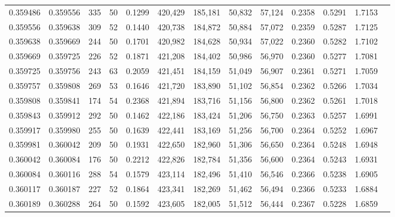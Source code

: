 \begin{tabular}{rrrrrrrrrrrrr}
0.359486 & 0.359556 &   335 &  50 &                                     0.1299 & 420,429 & 185,181 &  50,832 &  57,124 & 0.2358 & 0.5291 & 1.7153 \\
0.359556 & 0.359638 &   309 &  52 &                                     0.1440 & 420,738 & 184,872 &  50,884 &  57,072 & 0.2359 & 0.5287 & 1.7125 \\
0.359638 & 0.359669 &   244 &  50 &                                     0.1701 & 420,982 & 184,628 &  50,934 &  57,022 & 0.2360 & 0.5282 & 1.7102 \\
0.359669 & 0.359725 &   226 &  52 &                                     0.1871 & 421,208 & 184,402 &  50,986 &  56,970 & 0.2360 & 0.5277 & 1.7081 \\
0.359725 & 0.359756 &   243 &  63 &                                     0.2059 & 421,451 & 184,159 &  51,049 &  56,907 & 0.2361 & 0.5271 & 1.7059 \\
0.359757 & 0.359808 &   269 &  53 &                                     0.1646 & 421,720 & 183,890 &  51,102 &  56,854 & 0.2362 & 0.5266 & 1.7034 \\
0.359808 & 0.359841 &   174 &  54 &                                     0.2368 & 421,894 & 183,716 &  51,156 &  56,800 & 0.2362 & 0.5261 & 1.7018 \\
0.359843 & 0.359912 &   292 &  50 &                                     0.1462 & 422,186 & 183,424 &  51,206 &  56,750 & 0.2363 & 0.5257 & 1.6991 \\
0.359917 & 0.359980 &   255 &  50 &                                     0.1639 & 422,441 & 183,169 &  51,256 &  56,700 & 0.2364 & 0.5252 & 1.6967 \\
0.359981 & 0.360042 &   209 &  50 &                                     0.1931 & 422,650 & 182,960 &  51,306 &  56,650 & 0.2364 & 0.5248 & 1.6948 \\
0.360042 & 0.360084 &   176 &  50 &                                     0.2212 & 422,826 & 182,784 &  51,356 &  56,600 & 0.2364 & 0.5243 & 1.6931 \\
0.360084 & 0.360116 &   288 &  54 &                                     0.1579 & 423,114 & 182,496 &  51,410 &  56,546 & 0.2366 & 0.5238 & 1.6905 \\
0.360117 & 0.360187 &   227 &  52 &                                     0.1864 & 423,341 & 182,269 &  51,462 &  56,494 & 0.2366 & 0.5233 & 1.6884 \\
0.360189 & 0.360288 &   264 &  50 &                                     0.1592 & 423,605 & 182,005 &  51,512 &  56,444 & 0.2367 & 0.5228 & 1.6859 \\

\end{tabular}
